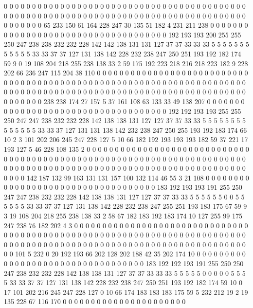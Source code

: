 0 0 0 0 0 0 0 0 0 0 0 0 0 0 0 0 0 0 0 0
0 0 0 0 0 0 0 0 0 0 0 0 0 0 0 0 0 0 0 0
0 0 0 0 0 0 0 0 0 0 0 0 0 0 0 0 0 0 0 0
0 0 0 0 0 0 0 0 0 0 0 0 0 0 0 0 0 0 0 0
0 0 0 0 0 0 0 0 0 0 0 0 0 65 233 150 61 164 228 247
30 135 51 182 4 231 211 238 0 0 0 0 0 0 0 0 0 0 0 0
0 0 0 0 0 0 0 0 0 0 0 0 0 0 0 0 0 0 0 0
0 0 0 0 192 193 193 200 255 255 250 247 238 238 232 232 228 142 142 138
131 131 127 37 37 33 33 33 5 5 5 5 5 5 5 5 5 5 5 5
33 33 37 37 127 131 138 142 228 232 238 247 250 251 193 192 182 174 59 9
0 19 108 204 218 255 238 138 33 2 59 175 192 223 218 216 218 223 182 9
228 202 66 236 247 115 204 38 110 0 0 0 0 0 0 0 0 0 0 0
0 0 0 0 0 0 0 0 0 0 0 0 0 0 0 0 0 0 0 0
0 0 0 0 0 0 0 0 0 0 0 0 0 0 0 0 0 0 0 0
0 0 0 0 0 0 0 0 0 0 0 0 0 0 0 0 0 0 0 0
0 0 0 0 0 0 0 0 0 0 0 0 0 0 0 0 0 0 0 0
0 0 0 0 0 0 0 0 0 0 0 0 0 0 0 0 0 0 0 0
0 0 0 0 0 0 0 0 0 238 238 174 27 157 5 37 161 108 63 133
33 49 138 207 0 0 0 0 0 0 0 0 0 0 0 0 0 0 0 0
0 0 0 0 0 0 0 0 0 0 0 0 0 0 0 0 0 0 0 0
192 192 193 193 255 255 250 247 247 238 232 232 228 142 138 138 131 127 127 37
37 33 33 5 5 5 5 5 5 5 5 5 5 5 5 5 5 33 33 37
127 131 131 138 142 232 238 247 250 255 193 192 183 174 66 10 2 3 101 202
206 245 247 228 127 5 10 66 182 192 193 193 193 182 59 37 221 17 193 127
5 46 228 108 135 2 0 0 0 0 0 0 0 0 0 0 0 0 0 0
0 0 0 0 0 0 0 0 0 0 0 0 0 0 0 0 0 0 0 0
0 0 0 0 0 0 0 0 0 0 0 0 0 0 0 0 0 0 0 0
0 0 0 0 0 0 0 0 0 0 0 0 0 0 0 0 0 0 0 0
0 0 0 0 0 0 0 0 0 0 0 0 0 0 0 0 0 0 0 0
0 0 0 0 0 0 0 0 0 0 0 0 0 0 0 0 0 0 0 0
0 0 0 0 0 142 187 132 99 163 131 131 157 100 132 114 46 55 3 21
108 0 0 0 0 0 0 0 0 0 0 0 0 0 0 0 0 0 0 0
0 0 0 0 0 0 0 0 0 0 0 0 0 0 0 0 183 192 193 193
191 255 250 247 247 238 232 232 228 142 138 138 131 127 127 37 37 33 33 5
5 5 5 5 5 0 0 5 5 5 5 5 5 33 33 37 37 127 131 138
142 228 232 238 247 255 251 193 183 175 67 59 9 3 19 108 204 218 255 238
138 33 2 58 67 182 183 192 183 174 10 127 255 99 175 247 238 76 182 202
4 3 0 0 0 0 0 0 0 0 0 0 0 0 0 0 0 0 0 0
0 0 0 0 0 0 0 0 0 0 0 0 0 0 0 0 0 0 0 0
0 0 0 0 0 0 0 0 0 0 0 0 0 0 0 0 0 0 0 0
0 0 0 0 0 0 0 0 0 0 0 0 0 0 0 0 0 0 0 0
0 0 0 0 0 0 0 0 0 0 0 0 0 0 0 0 0 0 0 0
0 0 0 0 0 0 0 0 0 0 0 0 0 0 0 0 0 0 0 0
0 101 5 232 0 20 192 193 66 202 128 202 188 42 35 202 174 10 0 0
0 0 0 0 0 0 0 0 0 0 0 0 0 0 0 0 0 0 0 0
0 0 0 0 0 0 0 0 0 0 0 0 183 192 192 193 191 255 250 250
247 238 232 232 228 142 138 138 131 127 37 37 33 33 33 5 5 5 5 5
0 0 0 0 0 5 5 5 5 33 33 37 37 127 131 138 142 228 232 238
247 250 251 193 192 182 174 59 10 0 17 101 202 216 245 247 228 127 0 10
66 174 183 183 183 175 59 5 232 212 19 2 19 135 228 67 116 170 0 0
0 0 0 0 0 0 0 0 0 0 0 0 0 0 0 0 0 0 0 0
